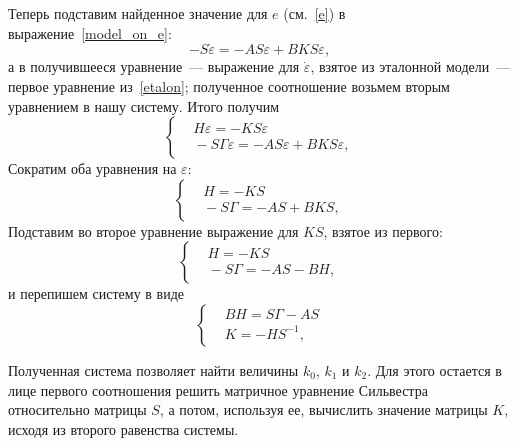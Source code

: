 \documentclass[12pt,a4paper,openany]{extarticle}
\begin{document}
Теперь подставим найденное значение для $e$ (см.~\eqref{e}) в выражение~\eqref{model_on_e}:
\begin{equation}
	-S\dot{\varepsilon} = -AS\varepsilon + BKS\varepsilon,
\end{equation}
а в получившееся уравнение~--- выражение для $\dot{\varepsilon}$, взятое из эталонной модели~--- первое уравнение из~\eqref{etalon}; полученное соотношение возьмем вторым уравнением в нашу систему.
Итого получим
\begin{equation}
	\left\{
	\begin{aligned}
		&\!H\varepsilon = -KS\varepsilon \\
		&\!-S\varGamma\varepsilon = -AS\varepsilon + BKS\varepsilon,	
	\end{aligned}
	\right.
\end{equation}
Сократим оба уравнения на $\varepsilon$:
\begin{equation}
	\left\{
	\begin{aligned}
		&\!H = -KS \\
		&\!-S\varGamma = -AS + BKS,	
	\end{aligned}
	\right.
\end{equation}
Подставим во второе уравнение выражение для $KS$, взятое из первого:
\begin{equation}
	\left\{
	\begin{aligned}
		&\!H = -KS \\
		&\!-S\varGamma = -AS - BH,	
	\end{aligned}
	\right.
\end{equation}
и перепишем систему в виде
\begin{equation}\label{sylv_final}
	\left\{
	\begin{aligned}
		&\!BH = S\varGamma - AS \\
		&\!K = -HS^{-1},	
	\end{aligned}
	\right.
\end{equation}

Полученная система позволяет найти величины $k_0$, $k_1$ и $k_2$.
Для этого остается в лице первого соотношения решить матричное уравнение Сильвестра относительно матрицы $S$, а потом, используя ее, вычислить значение матрицы $K$, исходя из второго равенства системы. 
\end{document}
